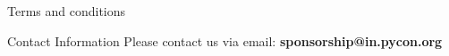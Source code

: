 \documentclass[10pt, compress, aspectratio=169]{beamer}
\begin{document}
\begin{frame}{Terms and conditions}
\begin{tiny}
    \end{tiny}
\end{frame}

\begin{frame}{Contact Information}
    \Large{\alert{Please contact us via email:} \textbf{sponsorship@in.pycon.org}}
\end{frame}
\end{document}
